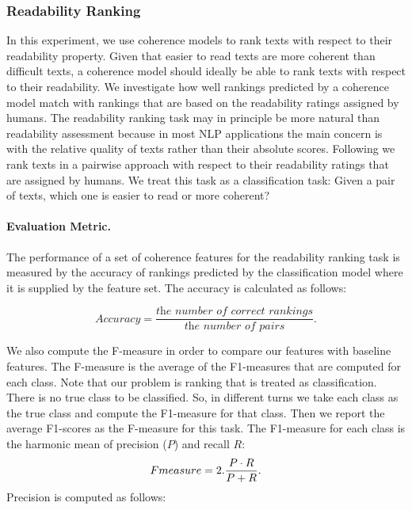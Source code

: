 \subsubsection{Readability Ranking}

In this experiment, we use coherence models to rank texts with respect to their readability property. 
Given that easier to read texts are more coherent than difficult texts, a coherence model should ideally be able to rank texts with respect to their readability. 
We investigate how well rankings predicted by a coherence model match with rankings that are based on the  readability ratings assigned by humans. 
The readability ranking task may in principle be more natural than readability assessment because in most NLP applications the main concern is with the relative quality of texts rather than their absolute scores. 
Following  we rank texts in a pairwise approach with respect to their readability ratings that are assigned by humans. 
We treat this task as a classification task: Given a pair of texts, which one is easier to read or more coherent?

\paragraph{Evaluation Metric.}
The performance of a set of coherence features for the readability ranking task is measured by the accuracy of rankings  predicted by the classification model where it is supplied by the feature set. 
The accuracy is calculated as follows:

\begin{equation}
Accuracy = \frac{\textit{the number of correct rankings}}{\textit{the number of pairs}}. 
\end{equation} 

We also compute the F-measure in order to compare our features with baseline features. 
The F-measure is the average of the F1-measures that are computed for each class. 
Note that our problem is ranking that is treated as classification. 
There is no true class to be classified. 
So, in different turns we take each class as the true class and compute the F1-measure for that class. 
Then we report the average F1-scores as the F-measure for this task. 
The F1-measure for each class is the harmonic mean of precision ($P$) and recall $R$:
\begin{equation}
F\-measure = 2.\frac{P \cdot R}{P + R}.  
\end{equation}
Precision is computed as follows: 

